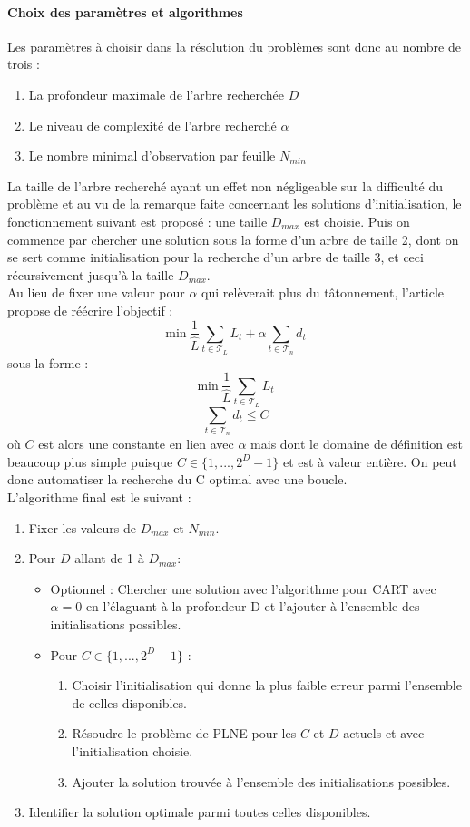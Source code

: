\documentclass[12pt]{report}
\begin{document}
\paragraph{Choix des paramètres et algorithmes} Les paramètres à choisir dans la résolution du problèmes sont donc au nombre de trois :
\begin{enumerate}
    \item La profondeur maximale de l'arbre recherchée \(D\)
    \item Le niveau de complexité de l'arbre recherché \(\alpha\)
    \item Le nombre minimal d'observation par feuille \(N_{min}\)
\end{enumerate}
La taille de l'arbre recherché ayant un effet non négligeable sur la difficulté du problème et au vu de la remarque faite concernant les solutions d'initialisation, le fonctionnement suivant est proposé : une taille \(D_{max}\) est choisie. Puis on commence par chercher une solution sous la forme d'un arbre de taille 2, dont on se sert comme initialisation pour la recherche d'un arbre de taille 3, et ceci récursivement jusqu'à la taille \(D_{max}\).\\
Au lieu de fixer une valeur pour \(\alpha\) qui relèverait plus du tâtonnement, l'article propose de réécrire l'objectif :
\[\mbox{min} ~ \frac{1}{\hat{L}}\sum_{t\in \mathcal{T}_L}L_t + \alpha \sum_{t\in \mathcal{T}_n} d_t\]
sous la forme :
\[\mbox{min} ~ \frac{1}{\hat{L}}\sum_{t\in \mathcal{T}_L}L_t\]
\[ \sum_{t\in \mathcal{T}_n} d_t \leq C\]
où \(C\) est alors une constante en lien avec \(\alpha\) mais dont le domaine de définition est beaucoup plus simple puisque \(C \in \{1,...,2^D-1\}\) et est à valeur entière. On peut donc automatiser la recherche du C optimal avec une boucle.\\
L'algorithme final est le suivant : 
\begin{enumerate}
    \item Fixer les valeurs de \(D_{max}\) et \(N_{min}\).
    \item Pour \(D\) allant de 1 à \(D_{max}\):
    \begin{itemize}
        \item Optionnel : Chercher une solution avec l'algorithme pour CART avec \(\alpha=0\) en l'élaguant à la profondeur D et l'ajouter à l'ensemble des initialisations possibles.
        \item Pour \(C \in \{1,...,2^D-1\}\) :
        \begin{enumerate}
            \item Choisir l'initialisation qui donne la plus faible erreur parmi l'ensemble de celles disponibles.
            \item Résoudre le problème de PLNE pour les \(C\) et \(D\) actuels et avec l'initialisation choisie.
            \item Ajouter la solution trouvée à l'ensemble des initialisations possibles.
        \end{enumerate}
    \end{itemize}
    \item Identifier la solution optimale parmi toutes celles disponibles.
\end{enumerate}
\end{document}
